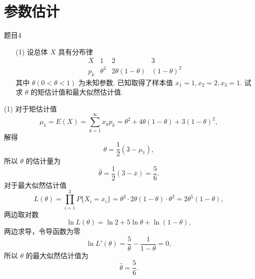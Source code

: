 \section{参数估计}

\begin{question}{题目4}
    \begin{enumerate}
        \item [(1)] 设总体 $X$ 具有分布律
              $$
                  \begin{array}{c|ccc}
                      X   & 1        & 2                 & 3            \\
                      \hline
                      p_k & \theta^2 & 2\theta(1-\theta) & (1-\theta)^2
                  \end{array}
              $$
              其中 $\theta(0 < \theta < 1)$ 为未知参数. 已知取得了样本值 $x_1 = 1, x_2 = 2, x_3 = 1$. 试求 $\theta$ 的矩估计值和最大似然估计值.
    \end{enumerate}
\end{question}
\begin{solution}
    (1) 对于矩估计值
    $$
        \mu_1 = E(X) = \sum_{k=1}^{\infty} x_kp_k = \theta^2+4\theta(1-\theta)+3(1-\theta)^2,
    $$
    解得
    $$
        \theta = \frac{1}{2}(3-\mu_1),
    $$
    所以 $\theta$ 的估计量为
    $$
        \hat{\theta} = \frac{1}{2}(3-\overline{x}) = \frac{5}{6}.
    $$
    对于最大似然估计值
    $$
        L(\theta) = \prod_{i=1}^{3} P\{X_i = x_i\}
        = \theta^2 \cdot 2\theta(1-\theta) \cdot \theta^2
        = 2\theta^5(1-\theta),
    $$
    两边取对数
    $$
        \ln L(\theta) = \ln2 + 5\ln\theta + \ln(1-\theta),
    $$
    两边求导，令导函数为零
    $$
        \ln L'(\theta) = \frac{5}{\theta} - \frac{1}{1-\theta} = 0,
    $$
    所以 $\theta$ 的最大似然估计值为
    $$
        \hat{\theta} = \frac{5}{6}.
    $$
\end{solution}



